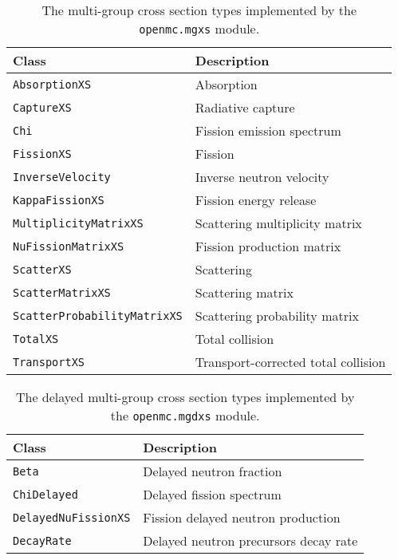 \begin{table}[h!]
  \centering
  \caption{The multi-group cross section types implemented by the \texttt{openmc.mgxs} module.}
  \small
  \label{tab:mgxs-types} 
  \vspace{6pt}
  \begin{tabular}{l l}
  \toprule
  \textbf{Class} &
  \textbf{Description} \\
  \midrule
  \texttt{AbsorptionXS} & Absorption \\
  \texttt{CaptureXS} & Radiative capture \\
  \texttt{Chi} & Fission emission spectrum \\
  \texttt{FissionXS} & Fission \\
  \texttt{InverseVelocity} & Inverse neutron velocity \\
  \texttt{KappaFissionXS} & Fission energy release \\
  \texttt{MultiplicityMatrixXS} & Scattering multiplicity matrix \\
  \texttt{NuFissionMatrixXS} & Fission production matrix \\
  \texttt{ScatterXS} & Scattering \\
  \texttt{ScatterMatrixXS} & Scattering matrix \\
  \texttt{ScatterProbabilityMatrixXS} & Scattering probability matrix \\
  \texttt{TotalXS} & Total collision \\
  \texttt{TransportXS} & Transport-corrected total collision \\
  \bottomrule
\end{tabular}
\end{table}

\begin{table}[h!]
  \centering
  \caption{The delayed multi-group cross section types implemented by the \texttt{openmc.mgdxs} module.}
  \small
  \label{tab:mdgxs-types} 
  \vspace{6pt}
  \begin{tabular}{l l}
  \toprule
  \textbf{Class} &
  \textbf{Description} \\
  \midrule
  \texttt{Beta} & Delayed neutron fraction \\
  \texttt{ChiDelayed} & Delayed fission spectrum \\
  \texttt{DelayedNuFissionXS} & Fission delayed neutron production \\
  \texttt{DecayRate} & Delayed neutron precursors decay rate \\
  \bottomrule
\end{tabular}
\end{table}


